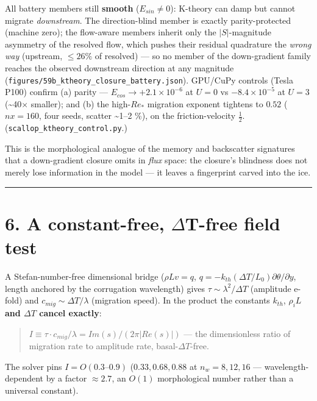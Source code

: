 \documentclass{jfm}
\newcommand{\code}[1]{\texttt{#1}}
\begin{document}
All battery members still \textbf{smooth} ($E_{sin}\ne 0$): K-theory can damp but cannot migrate \emph{downstream}. The direction-blind member is exactly parity-protected (machine zero); the flow-aware members inherit only the $|S|$-magnitude asymmetry of the resolved flow, which pushes their residual quadrature the \emph{wrong way} (upstream, $\le 26\%$ of resolved) — so no member of the down-gradient family reaches the observed downstream direction at any magnitude (\code{figures/\allowbreak{}59b\_\allowbreak{}ktheory\_\allowbreak{}closure\_\allowbreak{}battery.json}). GPU/CuPy controls (Tesla P100) confirm (a) parity — $E_{cos}\to +2.1\times 10^{-6}$ at $U=0$ vs $-8.4\times 10^{-5}$ at $U=3$ (\textasciitilde{}40\ensuremath{\times} smaller); and (b) the high-$Re_*$ migration exponent tightens to \textbf{$0.52$} ($nx=160$, four seeds, scatter \textasciitilde{}1–2 \%), on the friction-velocity $\tfrac{1}{2}$. (\code{scallop\_\allowbreak{}ktheory\_\allowbreak{}control.\allowbreak{}py}.)


This is the morphological analogue of the memory and backscatter signatures that a down-gradient closure omits in \emph{flux} space: the closure's blindness does not merely lose information in the model — it leaves a fingerprint carved into the ice.


\medskip\hrule\medskip


\section*{6. A constant-free, \ensuremath{\Delta}T-free field test}


A Stefan-number-free dimensional bridge ($\rho L v = q$, $q=-k_{th}(\Delta T/L_{0})\partial \theta /\partial y$, length anchored by the corrugation wavelength) gives $\tau  \sim  \lambda ^{2}/\Delta T$ (amplitude e-fold) and $c_{mig} \sim  \Delta T/\lambda $ (migration speed). In the product the constants $k_{th}$, $\rho _{i}L$ \textbf{and $\Delta T$ cancel exactly}:


\begin{quote}
$I \equiv  \tau \cdot c_{mig}/\lambda  = Im(s)/(2\pi |Re(s)|)$ — the dimensionless ratio of migration rate to amplitude rate, basal-$\Delta T$-free.
\end{quote}


The solver pins $I=O(0.3–0.9)$ ($0.33, 0.68, 0.88$ at $n_{w}=8,12,16$ — wavelength-dependent by a factor $\approx 2.7$, an $O(1)$ morphological number rather than a universal constant).
\end{document}
